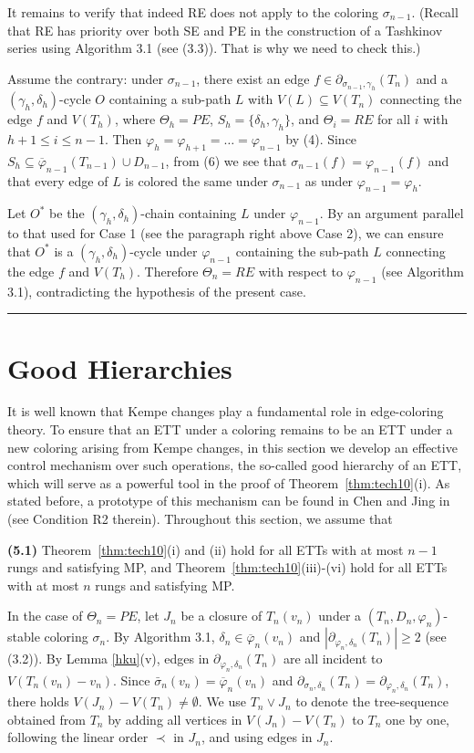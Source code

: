 \documentclass[11pt]{article}
\newcommand{\phibar}{\overline{\varphi}}
\def\qed{\hfill \rule{4pt}{7pt}}
\begin{document}
It remains to verify that indeed RE does not apply to the coloring $\sigma_{n-1}$. (Recall that RE has priority over both SE and PE in the construction of a
Tashkinov series using Algorithm 3.1 (see (3.3)). That is why we need to check this.)

Assume the contrary: under $\sigma_{n-1}$, there exist an edge $f\in\partial_{\sigma_{n-1},\gamma_h}(T_n)$ and a $(\gamma_h,\delta_h)$-cycle $O$ 
containing a sub-path $L$ with $V(L)\subseteq V(T_n)$ connecting the edge $f$ and $V(T_h)$, where $\Theta_h=PE$, $S_h=\{\delta_h,\gamma_h\}$,
and $\Theta_i=RE$ for all $i$ with $h+1\le i \le n-1$. Then $\varphi_{h}=\varphi_{h+1}=\ldots =\varphi_{n-1}$ by (4). Since $S_h\subseteq\phibar_{n-1}
(T_{n-1})\cup D_{n-1}$, from (6) we see that $\sigma_{n-1}(f)=\varphi_{n-1}(f)$ and that every edge of $L$ is colored the same under $\sigma_{n-1}$ 
as under $\varphi_{n-1}=\varphi_{h}$.  

Let $O^*$ be the $(\gamma_h,\delta_h)$-chain containing $L$ under $\varphi_{n-1}$. By an argument parallel to that used for Case 1 (see the paragraph right above
Case 2), we can ensure that $O^*$ is a $(\gamma_h,\delta_h)$-cycle under $\varphi_{n-1}$ containing the sub-path $L$ connecting the edge $f$ and 
$V(T_h)$. Therefore $\Theta_n=RE$ with respect to $\varphi_{n-1}$ (see Algorithm 3.1), contradicting the hypothesis of the present case. \qed


\section{Good Hierarchies}

It is well known that Kempe changes play a fundamental role in edge-coloring theory. To ensure that an ETT under a coloring remains to
be an ETT under a new coloring arising from Kempe changes, in this section we develop an effective control mechanism over such operations, 
the so-called good hierarchy of an ETT, which will serve as a powerful tool in the proof of Theorem~\ref{thm:tech10}(i). As stated before, a prototype
of this mechanism can be found in Chen and Jing in \cite{GG} (see Condition R2 therein). Throughout this 
section, we assume that

{\bf (5.1)} Theorem~\ref{thm:tech10}(i) and (ii) hold for all ETTs with at most $n-1$ rungs and satisfying MP, and 
Theorem~\ref{thm:tech10}(iii)-(vi) hold for all ETTs with at most $n$ rungs and satisfying MP.

In the case of $\Theta_n=PE$, let $J_n$ be a closure of $T_{n}(v_n)$ under a $(T_n,D_n,\varphi_n)$-stable coloring $\sigma_n$. By
Algorithm 3.1, $\delta_n\in \phibar_n(v_n)$ and $|\partial_{\varphi_n, \delta_n}(T_n)|\ge 2$ (see (3.2)). By Lemma \ref{hku}(v), edges in 
$\partial_{\varphi_n, \delta_n}(T_n)$ are all incident to $V(T_n(v_n)-v_n)$. Since $\bar{\sigma}_n(v_n)=\phibar_n(v_n)$
and $\partial_{\sigma_n, \delta_n}(T_n)=\partial_{\varphi_n, \delta_n}(T_n)$, there holds $V(J_n)-V(T_n)\neq\emptyset$. 
We use $T_n\vee J_n$ to denote the tree-sequence obtained from $T_n$ by adding all vertices in $V(J_n)-V(T_n)$ to $T_n$ one by one, 
following the linear order $\prec$ in $J_n$, and using edges in $J_n$. 
\end{document}

